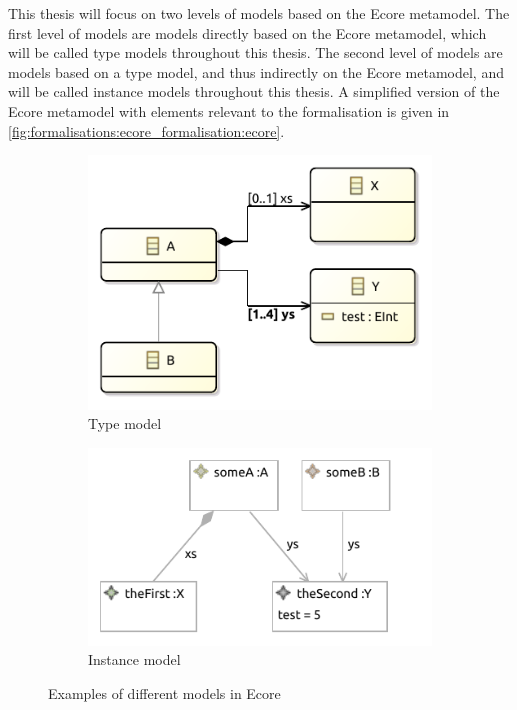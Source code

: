 This thesis will focus on two levels of models based on the Ecore metamodel. The first level of models are models directly based on the Ecore metamodel, which will be called type models throughout this thesis. The second level of models are models based on a type model, and thus indirectly on the Ecore metamodel, and will be called instance models throughout this thesis. A simplified version of the Ecore metamodel \cite{emf_documentation_2015} with elements relevant to the formalisation is given in \cref{fig:formalisations:ecore_formalisation:ecore}.

\begin{figure}[H]
    \centering
    \begin{subfigure}{0.45\textwidth}
        \centering
        \includegraphics{images/01_introduction/type_model_intro.pdf}
        \caption{Type model}
        \label{fig:introduction:eclipse_modeling_framework:type_model}
    \end{subfigure}
    \begin{subfigure}{0.45\textwidth}
        \centering
        \includegraphics{images/01_introduction/instance_model_intro.pdf}
        \caption{Instance model}
        \label{fig:introduction:eclipse_modeling_framework:instance_model}
    \end{subfigure}
    \caption{Examples of different models in Ecore}
    \label{fig:introduction:eclipse_modeling_framework:ecore}
\end{figure}

